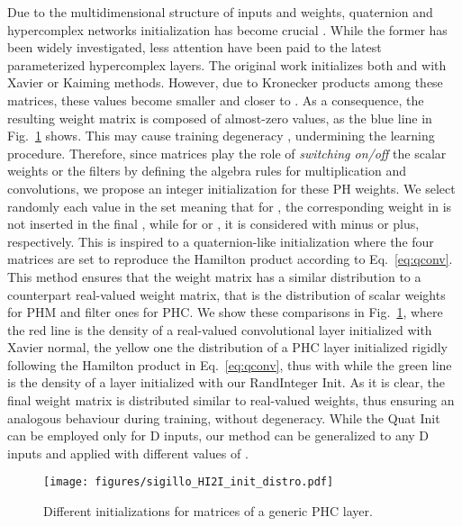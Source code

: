 \documentclass[conference]{IEEEtran}
\begin{document}
Due to the multidimensional structure of inputs and weights, quaternion and hypercomplex networks initialization has become crucial \cite{RicciardiMLSP2020, ParcolletICLR2019}. While the former has been widely investigated, less attention have been paid to the latest parameterized hypercomplex layers. The original work \cite{grassucci2021lightweight} initializes both  and  with Xavier or Kaiming methods. However, due to Kronecker products among these matrices, these values become smaller and closer to . As a consequence, the resulting weight matrix  is composed of almost-zero values, as the blue line in Fig.~\ref{fig:init} shows. This may cause training degeneracy \cite{Zhao2021ZerOII, Bachlechner2021ReZeroIA}, undermining the learning procedure. Therefore, since matrices  play the role of \textit{switching on/off} the scalar weights or the filters by defining the algebra rules for multiplication and convolutions, we propose an integer initialization for these PH weights. We select randomly each value in the set  meaning that for , the corresponding weight in  is not inserted in the final , while for  or , it is considered with minus or plus, respectively. This is inspired to a quaternion-like initialization where the four matrices  are set to reproduce the Hamilton product according to Eq.~\ref{eq:qconv}. This method ensures that the weight matrix  has a similar distribution to a counterpart real-valued weight matrix, that is the distribution of scalar weights for PHM and filter ones for PHC. We show these comparisons in Fig.~\ref{fig:init}, where the red line is the density of a real-valued convolutional layer initialized with Xavier normal, the yellow one the distribution of a PHC layer initialized rigidly following the Hamilton product in Eq.~\ref{eq:qconv}, thus with  while the green line is the  density of a layer initialized with our RandInteger Init. As it is clear, the final weight matrix is distributed similar to real-valued weights, thus ensuring an analogous behaviour during training, without degeneracy. While the Quat Init can be employed only for D inputs, our method can be generalized to any D inputs and applied with different values of .

\begin{figure}
    \centering
    \texttt{[image: figures/sigillo\_HI2I\_init\_distro.pdf]}
    \caption{Different initializations for matrices  of a generic PHC layer.}
    \label{fig:init}
\end{figure}
\end{document}
